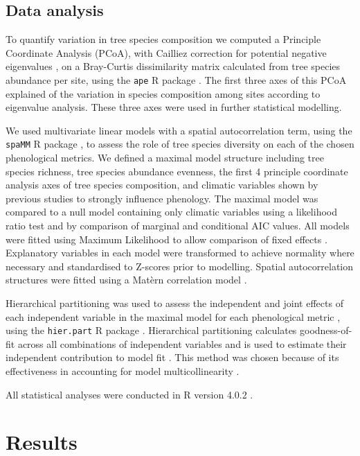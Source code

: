 \documentclass[11pt,a4paper]{article}
\begin{document}
\subsection{Data analysis}

To quantify variation in tree species composition we computed a Principle Coordinate Analysis (PCoA), with Cailliez correction for potential negative eigenvalues \citep{Legendre1998}, on a Bray-Curtis dissimilarity matrix calculated from tree species abundance per site, using the \texttt{ape} R package \citep{ape2019}. The first three axes of this PCoA explained \pcoaPer{} of the variation in species composition among sites according to eigenvalue analysis. These three axes were used in further statistical modelling.

We used multivariate linear models with a spatial autocorrelation term, using the \texttt{spaMM} R package \citep{spaMM2014}, to assess the role of tree species diversity on each of the chosen phenological metrics. We defined a maximal model structure including tree species richness, tree species abundance evenness, the first 4 principle coordinate analysis axes of tree species composition, and climatic variables shown by previous studies to strongly influence phenology. The maximal model was compared to a null model containing only climatic variables using a likelihood ratio test and by comparison of marginal and conditional AIC values. All models were fitted using Maximum Likelihood to allow comparison of fixed effects \citep{}. Explanatory variables in each model were transformed to achieve normality where necessary and standardised to Z-scores prior to modelling. Spatial autocorrelation structures were fitted using a Mat\`{e}rn correlation model \citep{}.

Hierarchical partitioning was used to assess the independent and joint effects of each independent variable in the maximal model for each phenological metric \citep{Chevan1991, MacNally2002}, using the \texttt{hier.part} R package \citep{hier.part2004}. Hierarchical partitioning calculates goodness-of-fit across all combinations of independent variables \citep{Walsh2013} and is used to estimate their independent contribution to model fit \citep{MacNally2002}. This method was chosen because of its effectiveness in accounting for model multicollinearity \citep{Olea2010}. 

All statistical analyses were conducted in R version 4.0.2 \citep{R2020}.

\section{Results}
\end{document}
